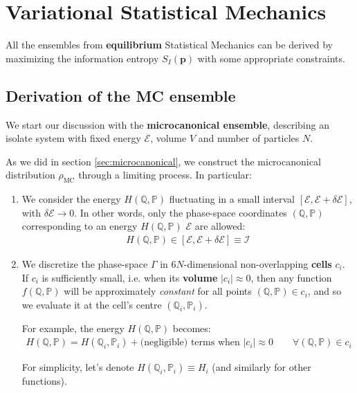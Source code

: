 \documentclass[../template.tex]{subfiles}
\begin{document}
\section{Variational Statistical Mechanics}
All the ensembles from \textbf{equilibrium} Statistical Mechanics can be derived by maximizing the information entropy $S_I(\bm{p})$ with some appropriate constraints.

\subsection{Derivation of the MC ensemble}
We start our discussion with the \textbf{microcanonical ensemble}, describing an isolate system with fixed energy $\mathcal{E}$, volume $V$ and number of particles $N$.

\medskip
\setlength{\fboxsep}{.3\fboxsep}
As we did in section \ref{sec:microcanonical}, we construct the microcanonical distribution $\rho_{\mathrm{MC}}$ through a limiting process. In particular:
\begin{enumerate}
    \item We consider the energy $H(\mathbb{Q},\mathbb{P})$ fluctuating in a small interval $[\mathcal{E}, \mathcal{E} + \delta \mathcal{E}]$, with $\delta \mathcal{E} \to 0$. In other words, only the phase-space coordinates $(\mathbb{Q}, \mathbb{P})$ corresponding to an energy $H(\mathbb{Q}, \mathbb{P})$  $\mathcal{E}$ are allowed:
    \begin{align*}
        H(\mathbb{Q}, \mathbb{P}) \in [\mathcal{E}, \mathcal{E}+\delta \mathcal{E}] \equiv \mathcal{I}
    \end{align*}
    \item We discretize the phase-space $\Gamma$ in $6N$-dimensional non-overlapping \textbf{cells} $\boxed{c_i}$. If $\boxed{c_i}$ is sufficiently small, i.e. when its \textbf{volume} $|c_i| \approx 0$, then any function $f(\mathbb{Q}, \mathbb{P})$ will be approximately \textit{constant} for all points $(\mathbb{Q}, \mathbb{P}) \in \boxed{c_i}$, and so we evaluate it at the cell's centre $(\mathbb{Q}_i, \mathbb{P}_i)$.
    
    For example, the energy $H(\mathbb{Q}, \mathbb{P})$ becomes:
    \begin{align*}
        H(\mathbb{Q}, \mathbb{P}) = H(\mathbb{Q}_i, \mathbb{P}_i) + \text{(negligible) terms when $|c_i| \approx 0$} \qquad \forall (\mathbb{Q}, \mathbb{P}) \in \boxed{c_i}
    \end{align*}

    For simplicity, let's denote $H(\mathbb{Q}_i,\mathbb{P}_i) \equiv H_i$ (and similarly for other functions).
\end{enumerate}
\end{document}
